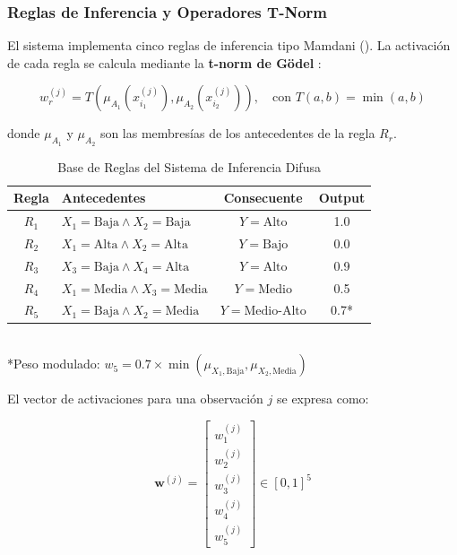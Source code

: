 \subsubsection{Reglas de Inferencia y Operadores T-Norm}
\label{subsubsec:reglas_inferencia}

El sistema implementa cinco reglas de inferencia tipo Mamdani (). La activación de cada regla se calcula mediante la \textbf{t-norm de Gödel} \citep{Ross2010}:

\begin{equation}
w_r^{(j)} = T\left(\mu_{A_1}(x_{i_1}^{(j)}), \mu_{A_2}(x_{i_2}^{(j)})\right), \quad \text{con } T(a, b) = \min(a, b)
\label{eq:tnorm_godel}
\end{equation}

donde \(\mu_{A_1}\) y \(\mu_{A_2}\) son las membresías de los antecedentes de la regla \(R_r\).

\begin{table}[H]
\centering
\caption{Base de Reglas del Sistema de Inferencia Difusa}
\label{tab:reglas_difusas}
\small
\begin{tabular}{@{}clcc@{}}
\toprule
\textbf{Regla} & \textbf{Antecedentes} & \textbf{Consecuente} & \textbf{Output} \\
\midrule
\(R_1\) & \(X_1=\text{Baja} \land X_2=\text{Baja}\)   & \(Y=\text{Alto}\)       & 1.0 \\
\(R_2\) & \(X_1=\text{Alta} \land X_2=\text{Alta}\)   & \(Y=\text{Bajo}\)       & 0.0 \\
\(R_3\) & \(X_3=\text{Baja} \land X_4=\text{Alta}\)   & \(Y=\text{Alto}\)       & 0.9 \\
\(R_4\) & \(X_1=\text{Media} \land X_3=\text{Media}\) & \(Y=\text{Medio}\)      & 0.5 \\
\(R_5\) & \(X_1=\text{Baja} \land X_2=\text{Media}\)  & \(Y=\text{Medio-Alto}\) & 0.7* \\
\bottomrule
\end{tabular}
\\[5pt]
\footnotesize{*Peso modulado: \(w_5 = 0.7 \times \min(\mu_{X_1,\text{Baja}}, \mu_{X_2,\text{Media}})\)}
\end{table}

El vector de activaciones para una observación \(j\) se expresa como:

\begin{equation}
\mathbf{w}^{(j)} = \begin{bmatrix}
w_1^{(j)} \\
w_2^{(j)} \\
w_3^{(j)} \\
w_4^{(j)} \\
w_5^{(j)}
\end{bmatrix} \in [0,1]^5
\label{eq:vector_activaciones}
\end{equation}

